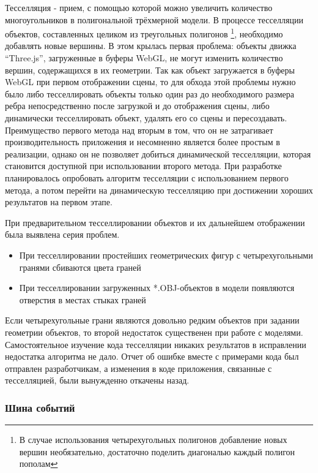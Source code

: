\documentclass[12pt, a4paper]{article}
\begin{document}
Тесселляция - прием, с помощью которой можно увеличить количество
многоугольников в полигональной трёхмерной модели. В процессе тесселляции
объектов, составленных целиком из треугольных полигонов \footnote{В случае
использования четырехугольных полигонов добавление новых вершин необязательно,
достаточно поделить диагональю каждый полигон пополам}, необходимо добавлять
новые вершины. В этом крылась первая проблема: объекты движка ``Three.js'',
загруженные в буферы WebGL, не могут изменить количество вершин, содержащихся в
их геометрии. Так как объект загружается в буферы WebGL при первом отображении
сцены, то для обхода этой проблемы нужно было либо тесселлировать объекты только
один раз до необходимого размера ребра непосредственно после загрузкой и до
отображения сцены, либо динамически тесселлировать объект, удалять его со сцены
и пересоздавать. Преимущество первого метода над вторым в том, что он не
затрагивает производительность приложения и несомненно является более простым в
реализации, однако он не позволяет добиться динамической тесселляции, которая
становится доступной при использовании второго метода. При разработке
планировалось опробовать алгоритм тесселляции с использованием первого метода, а
потом перейти на динамическую тесселляцию при достижении хороших результатов на
первом этапе.

При предварительном тесселлировании объектов и их дальнейшем отображении была
выявлена серия проблем.

\begin{itemize}
    \item При тесселлировании простейших геометрических фигур с четырехугольными
    гранями сбиваются цвета граней
    \item При тесселлировании загруженных *.OBJ-объектов в модели появляются
    отверстия в местах стыках граней
\end{itemize}

Если четырехугольные грани являются довольно редким объектов при задании
геометрии объектов, то второй недостаток существенен при работе с моделями.
Самостоятельное изучение кода тесселляции никаких результатов в
исправлении недостатка алгоритма не дало. Отчет об ошибке вместе с примерами
кода был отправлен разработчикам, а изменения в коде приложения,
связанные с тесселляцией, были вынужденно откачены назад.

\subsubsection{Шина событий}
\end{document}
